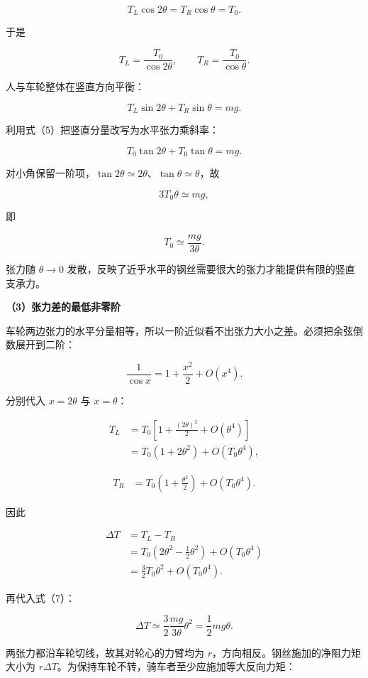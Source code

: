 \documentclass[12pt,a4paper,UTF8]{ctexart}
\begin{document}
\[
T_L\cos2\theta=T_R\cos\theta=T_0.
\tag{4}
\]

于是

\[
T_L=\frac{T_0}{\cos2\theta},
\qquad
T_R=\frac{T_0}{\cos\theta}.
\tag{5}
\]

人与车轮整体在竖直方向平衡：

\[
T_L\sin2\theta+T_R\sin\theta=mg.
\]

利用式（5）把竖直分量改写为水平张力乘斜率：

\[
T_0\tan2\theta+T_0\tan\theta=mg.
\tag{6}
\]

对小角保留一阶项，\(\tan2\theta\simeq2\theta\)、\(\tan\theta\simeq\theta\)，故

\[
3T_0\theta\simeq mg,
\]

即

\[
\boxed{T_0\simeq\frac{mg}{3\theta}}.
\tag{7}
\]

张力随 \(\theta\to0\)
发散，反映了近乎水平的钢丝需要很大的张力才能提供有限的竖直支承力。

\textbf{（3）张力差的最低非零阶}

车轮两边张力的水平分量相等，所以一阶近似看不出张力大小之差。必须把余弦倒数展开到二阶：

\[
\frac1{\cos x}=1+\frac{x^2}{2}+O(x^4).
\tag{8}
\]

分别代入 \(x=2\theta\) 与 \(x=\theta\)：

\[
\begin{aligned}
T_L
&=T_0\left[1+\frac{(2\theta)^2}{2}+O(\theta^4)\right]\\
&=T_0\left(1+2\theta^2\right)+O(T_0\theta^4),
\end{aligned}
\tag{9}
\]

\[
\begin{aligned}
T_R
&=T_0\left(1+\frac{\theta^2}{2}\right)+O(T_0\theta^4).
\end{aligned}
\tag{10}
\]

因此

\[
\begin{aligned}
\Delta T
&=T_L-T_R\\
&=T_0\left(2\theta^2-\frac12\theta^2\right)+O(T_0\theta^4)\\
&=\frac32T_0\theta^2+O(T_0\theta^4).
\end{aligned}
\tag{11}
\]

再代入式（7）：

\[
\Delta T
\simeq\frac32\frac{mg}{3\theta}\theta^2
=\frac12mg\theta.
\tag{12}
\]

两张力都沿车轮切线，故其对轮心的力臂均为
\(r\)，方向相反。钢丝施加的净阻力矩大小为
\(r\Delta T\)。为保持车轮不转，骑车者至少应施加等大反向力矩：
\end{document}
